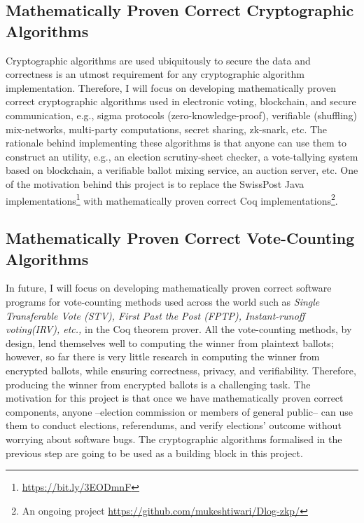 \documentclass[a4paper]{article}
\begin{document}
\subsection{Mathematically Proven Correct Cryptographic Algorithms}
	Cryptographic algorithms are used ubiquitously to secure 
	the data and correctness is an utmost requirement for 
	any cryptographic algorithm implementation. Therefore, 
	I will focus on developing mathematically proven correct cryptographic 
	algorithms used in electronic voting, blockchain, and secure communication, e.g., 
  	sigma protocols (zero-knowledge-proof), verifiable (shuffling) mix-networks, 
  	multi-party computations, secret sharing, zk-snark, etc.
	The rationale behind implementing these algorithms is that anyone can use them to construct 
	an utility, e.g., an election scrutiny-sheet checker, 
	a vote-tallying system based on blockchain,
	a verifiable ballot mixing service, an auction server, etc. One of the motivation
	behind this project is to replace the SwissPost Java implementations\footnote{\url{https://bit.ly/3EODmnF}} 
	with mathematically proven correct Coq 
	implementations\footnote{An ongoing project \url{https://github.com/mukeshtiwari/Dlog-zkp/}}.

	

	

\subsection{Mathematically Proven Correct Vote-Counting Algorithms}
In future, I will focus on developing mathematically proven correct
software programs for vote-counting methods used across the world
such as \textit{Single Transferable Vote (STV), 
First Past the Post (FPTP), Instant-runoff voting(IRV), etc.,} in the Coq theorem prover. 
All the vote-counting methods, by design, lend themselves well to computing the 
winner from plaintext ballots; however, so far there is very little research in computing 
the winner from encrypted ballots, while ensuring correctness, privacy, and 
verifiability. Therefore, producing the winner from encrypted 
ballots is a challenging task.
The motivation for this project is that once we have  mathematically proven correct 
components, anyone --election commission or members of general public-- can use them 
to conduct elections, referendums, and verify elections' outcome 
without worrying about software bugs.  The cryptographic algorithms formalised in 
the previous step are going to be used as a building block in this project.
\end{document}
